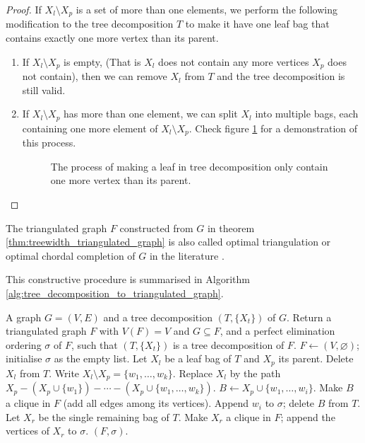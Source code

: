\begin{proof}
	If $X_l \setminus X_p$ is a set of more than one elements, we perform the following modification to the tree decomposition $T$ to make it have one leaf bag that contains exactly one more vertex than its parent.
	\begin{enumerate}
		\item If $X_l \setminus X_p$ is empty, (That is $X_l$ does not contain any more vertices $X_p$ does not contain), then we can remove $X_l$ from $T$ and the tree decomposition is still valid.
		\item If $X_l \setminus X_p$ has more than one element, we can split $X_l$ into multiple bags, each containing one more element of $X_l \setminus X_p$. Check figure \ref{fig:demo_leaf_tree_decomposition} for a demonstration of this process.

\begin{figure}[ht]
	\centering
	
	\caption{The process of making a leaf in tree decomposition only contain one more vertex than its parent.}
	\label{fig:demo_leaf_tree_decomposition}
\end{figure}\end{enumerate}
\end{proof}

The triangulated graph $F$ constructed from $G$ in theorem \ref{thm:treewidth_triangulated_graph} is also called optimal triangulation or optimal chordal completion of $G$ in the literature \cite{rose1970triangulated}.

This constructive procedure is summarised in Algorithm \ref{alg:tree_decomposition_to_triangulated_graph}.

\begin{algorithm}[ht]
	\caption{Triangulation from a tree decomposition}\label{alg:tree_decomposition_to_triangulated_graph}
	\begin{algorithmic}[1]
		\Require A graph $G = (V, E)$ and a tree decomposition $(T, \{X_t\})$ of $G$.
		\Ensure Return a triangulated graph $F$ with $V(F) = V$ and $G \subseteq F$, and a perfect elimination ordering $\sigma$ of $F$, such that $(T, \{X_t\})$ is a tree decomposition of $F$.
		\State $F \gets (V, \varnothing)$; \quad initialise $\sigma$ as the empty list.
			\State Let $X_l$ be a leaf bag of $T$ and $X_p$ its parent.
				\State Delete $X_l$ from $T$. 
			\Else
				\State Write $X_l \setminus X_p = \{w_1, \dots, w_k\}$.
				\State Replace $X_l$ by the path $X_p - (X_p \cup \{w_1\}) - \cdots - (X_p \cup \{w_1, \dots, w_k\})$. 
					\State $B \gets X_p \cup \{w_1, \dots, w_i\}$.
					\State Make $B$ a clique in $F$ (add all edges among its vertices).
					\State Append $w_i$ to $\sigma$; delete $B$ from $T$.
				\EndFor
			\EndIf
		\EndWhile
		\State Let $X_r$ be the single remaining bag of $T$.
		\State Make $X_r$ a clique in $F$; append the vertices of $X_r$ to $\sigma$.
		\State \Return $(F, \sigma)$.
	\end{algorithmic}
\end{algorithm}


